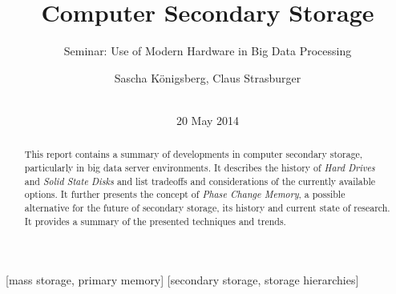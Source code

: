 \documentclass{acm_proc_article-sp}
\begin{document}
\title{Computer Secondary Storage}
\subtitle{Seminar: Use of Modern Hardware in Big Data Processing}

\author{
\alignauthor
Sascha K{\"o}nigsberg, Claus Strasburger\\
       \\
}

\date{20 May 2014}

\maketitle
\begin{abstract}
This report contains a summary of developments in computer secondary storage, particularly in big data server environments. It describes the history of \emph{Hard Drives} and \emph{Solid State Disks} and list tradeoffs and considerations of the currently available options. It further presents the concept of \emph{Phase Change Memory}, a possible alternative for the future of secondary storage, its history and current state of research. It provides a summary of the presented techniques and trends.%
\end{abstract}

[mass storage, primary memory]
[secondary storage, storage hierarchies]

\end{document}
